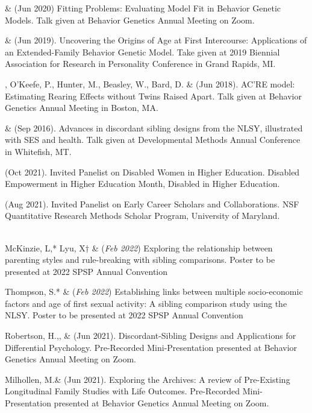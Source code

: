 \item \meb \& \Joe (Jun 2020) Fitting Problems: Evaluating Model Fit in Behavior Genetic Models. Talk given at Behavior Genetics Annual Meeting on Zoom.
%
\item \meb \& \Joe (Jun 2019). Uncovering the Origins of Age at First Intercourse: Applications of an Extended-Family Behavior Genetic Model. Take given at 2019 Biennial Association for Research in Personality Conference in Grand Rapids, MI.
%
\item\meb, O'Keefe, P., Hunter, M., Beasley, W., Bard, D. \& \Joe (Jun 2018). AC'RE model: Estimating Rearing Effects without Twins Raised Apart. Talk given at Behavior Genetics Annual Meeting in Boston, MA.
%
\item\meb \& \joe (Sep 2016). Advances in discordant sibling designs from the NLSY, illustrated with SES and health. Talk given at Developmental Methods Annual Conference in Whitefish, MT.\medskip\\
%
%
%
\item \meb (Oct 2021). Invited Panelist on Disabled Women in Higher Education. Disabled Empowerment in Higher Education Month, Disabled in Higher Education.
%
\item \meb (Aug 2021). Invited Panelist on Early Career Scholars and Collaborations. NSF Quantitative Research Methods Scholar Program, University of Maryland.\medskip\\
\pagebreak\\
%
%
\item McKinzie, L,* Lyu, X$\dagger$ \& \meb (\textit{Feb 2022}) Exploring the relationship between parenting styles and rule-breaking with sibling comparisons. Poster to be presented at 2022 SPSP Annual Convention
%
\item Thompson, S.* \& \meb (\textit{Feb 2022}) Establishing links between multiple socio-economic factors and age of first sexual activity: A sibling comparison study using the NLSY. Poster to be presented at 2022 SPSP Annual Convention
%
\item Robertson, H.,\noteA \Joe, \&  \meb (Jun 2021). Discordant-Sibling Designs and Applications for Differential Psychology. Pre-Recorded Mini-Presentation presented at Behavior Genetics Annual Meeting on Zoom.
%
\item Milhollen, M.\noteA \&  \meb (Jun 2021). Exploring the Archives: A review of Pre-Existing Longitudinal Family Studies with Life Outcomes. Pre-Recorded Mini-Presentation presented at Behavior Genetics Annual Meeting on Zoom.
